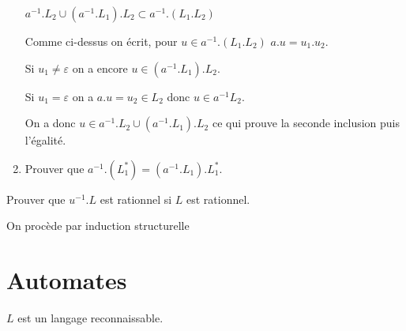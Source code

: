 \begin{Answer}
\begin{enumerate}
$a^{-1}.L_2 \cup (a^{-1}.L_1).L_2 \subset  a^{-1}.(L_1.L_2)$

\smallskip

Comme ci-dessus on écrit, pour $u\in  a^{-1}.(L_1.L_2)$ $a.u = u_1.u_2$.	

Si $u_1\ne \varepsilon$ on a encore $u\in (a^{-1}.L_1).L_2$.

Si $u_1= \varepsilon$ on a $a.u=u_2\in L_2$ donc $u\in a^{-1}L_2$.

On a donc $u \in a^{-1}.L_2 \cup (a^{-1}.L_1).L_2$ ce qui prouve la seconde inclusion puis l'égalité.
\item Prouver que $a^{-1}.(L_1^*) = (a^{-1}.L_1).L_1^*$.
\end{enumerate}
\end{Answer}
\begin{Exercise}[title = Rationalité] 
Prouver que $u^{-1}.L$ est rationnel si $L$ est rationnel.
\end{Exercise}
\begin{Answer}
On procède par induction structurelle 
\end{Answer}
\section{Automates}
$L$ est un langage reconnaissable.

